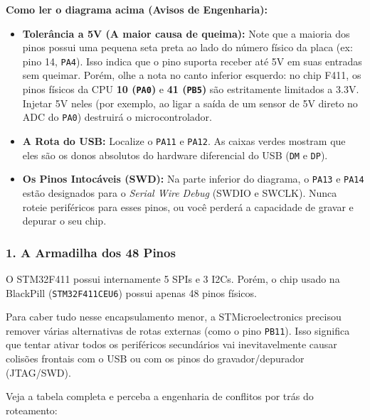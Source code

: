 \documentclass[12pt,a4paper]{article}
\begin{document}
\textbf{Como ler o diagrama acima (Avisos de Engenharia):}
\begin{itemize}
    \item \textbf{Tolerância a 5V (A maior causa de queima):} Note que a maioria dos pinos possui uma pequena seta preta ao lado do número físico da placa (ex: pino 14, \texttt{PA4}). Isso indica que o pino suporta receber até 5V em suas entradas sem queimar. Porém, olhe a nota no canto inferior esquerdo: no chip F411, os pinos físicos da CPU \textbf{10 (\texttt{PA0})} e \textbf{41 (\texttt{PB5})} são estritamente limitados a 3.3V. Injetar 5V neles (por exemplo, ao ligar a saída de um sensor de 5V direto no ADC do \texttt{PA0}) destruirá o microcontrolador.
    \item \textbf{A Rota do USB:} Localize o \texttt{PA11} e \texttt{PA12}. As caixas verdes mostram que eles são os donos absolutos do hardware diferencial do USB (\texttt{DM} e \texttt{DP}).
    \item \textbf{Os Pinos Intocáveis (SWD):} Na parte inferior do diagrama, o \texttt{PA13} e \texttt{PA14} estão designados para o \textit{Serial Wire Debug} (SWDIO e SWCLK). Nunca roteie periféricos para esses pinos, ou você perderá a capacidade de gravar e depurar o seu chip.
\end{itemize}

\subsubsection*{1. A Armadilha dos 48 Pinos}
O STM32F411 possui internamente 5 SPIs e 3 I2Cs. Porém, o chip usado na BlackPill (\texttt{STM32F411CEU6}) possui apenas 48 pinos físicos. 

Para caber tudo nesse encapsulamento menor, a STMicroelectronics precisou remover várias alternativas de rotas externas (como o pino \texttt{PB11}). Isso significa que tentar ativar todos os periféricos secundários vai inevitavelmente causar colisões frontais com o USB ou com os pinos do gravador/depurador (JTAG/SWD).

Veja a tabela completa e perceba a engenharia de conflitos por trás do roteamento:
\end{document}
